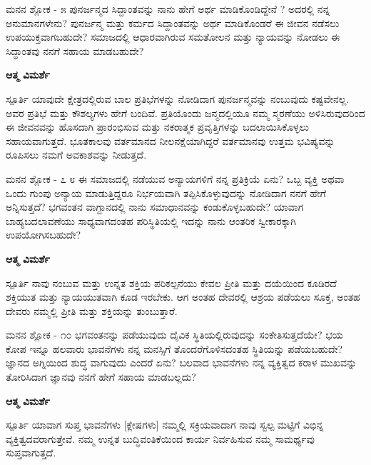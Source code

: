 \newpage
\begin{mananam}{\mananamfont ಮನನ ಶ್ಲೋಕ - ೫}
\footnotesize \mananamtext ಪುನರ್ಜನ್ಮದ ಸಿದ್ದಾಂತವನ್ನು ನಾನು ಹೇಗೆ ಅರ್ಥ ಮಾಡಿಕೊಂಡಿದ್ದೇನೆ ? ಅದರಲ್ಲಿ ನನ್ನ ಅನುಮಾನಗಳೇನು?  ಪುನರ್ಜನ್ಮ ಮತ್ತು ಕರ್ಮದ ಸಿದ್ದಾಂತವನ್ನು ಅರ್ಥ ಮಾಡಿಕೊಂಡರೆ ಈ ಜೀವನ ನಡೆಸಲು ಉಪಯುಕ್ತವಾಗಬಹುದೇ? ಸಮಾಜದಲ್ಲಿ ಆಧಾರವಾಗಿರುವ ಸಮತೋಲನ ಮತ್ತು ನ್ಯಾಯವನ್ನು ನೋಡಲು ಈ ಸಿದ್ಧಾಂತವು ನನಗೆ ಸಹಾಯ ಮಾಡಬಹುದೇ?
\end{mananam}
\WritingHand\enspace\textbf{ಆತ್ಮ ವಿಮರ್ಶೆ}\\
\begin{inspiration}{\mananamfont ಸ್ಪೂರ್ತಿ}
\footnotesize \mananamtext ಯಾವುದೇ ಕ್ಷೇತ್ರದಲ್ಲಿರುವ ಬಾಲ ಪ್ರತಿಭೆಗಳನ್ನು ನೋಡಿದಾಗ ಪುನರ್ಜನ್ಮವನ್ನು ನಂಬುವುದು ಕಷ್ಟವೇನಲ್ಲ. ಅವರ ಪ್ರತಿಭೆ ಮತ್ತು ಕೌಶಲ್ಯಗಳು ಹೇಗೆ ಬಂದಿವೆ. ಪ್ರತಿಯೊಂದು ಜನ್ಮದಲ್ಲಿಯೂ ನಮ್ಮ ಸ್ಮರಣೆಯು ಅಳಿಸಿರುವುದರಿಂದ ಈ ಜೀವನವನ್ನು ಹೊಸದಾಗಿ ಪ್ರಾರಂಭಿಸುವ ಮತ್ತು ನಕರಾತ್ಮಕ ಪ್ರವೃತ್ತಿಗಳನ್ನು ಬದಲಾಯಿಸಿಕೊಳ್ಳಲು ಸಹಾಯವಾಗುತ್ತದೆ. ಭೂತಕಾಲವು ವರ್ತಮಾನದ ನೀಲನಕ್ಷೆಯಾಗಿದ್ದರೆ ವರ್ತಮಾನವು ಉತ್ತಮ ಭವಿಷ್ಯವನ್ನು ರೂಪಿಸಲು ನಮಗೆ ಅವಕಾಶವನ್ನು ನೀಡುತ್ತದೆ.\\
\end{inspiration}
\newpage
\newpage
\begin{mananam}{\mananamfont ಮನನ ಶ್ಲೋಕ - ೭ ೮}
\footnotesize \mananamtext ಈ ಸಮಾಜದಲ್ಲಿ ನಡೆಯುವ ಅನ್ಯಾಯಗಳಿಗೆ ನನ್ನ ಪ್ರತಿಕ್ರಿಯೆ ಏನು? ಒಬ್ಬ ವ್ಯಕ್ತಿ ಅಥವಾ ಒಂದು ಗುಂಪು ಅನ್ಯಾಯ ಮಾಡುತ್ತಿದ್ದರೂ ನಿರ್ಭಯವಾಗಿ ತಪ್ಪಿಸಿಕೊಳ್ಳುವುದನ್ನು ನೋಡಿದಾಗ ನನಗೆ ಹೇಗೆ ಅನ್ನಿಸುತ್ತದೆ? ಭಗವಂತನ  ವಾಗ್ದಾನದಲ್ಲಿ ನಾನು ಸಮಾಧಾನವನ್ನು ಕಂಡುಕೊಳ್ಳಬಹುದೇ? ಯಾವಾಗ ಬಾಹ್ಯಬದಲಾವಣೆಯು ಸಾಧ್ಯವಾಗದಂತಹ ಪರಿಸ್ಥಿತಿಯಲ್ಲಿ ಇದನ್ನು ನಾನು ಆಂತರಿಕ ಸ್ವೀಕಾರಕ್ಕಾಗಿ ಉಪಯೋಗಿಸಬಹುದೇ?
\end{mananam}
\WritingHand\enspace\textbf{ಆತ್ಮ ವಿಮರ್ಶೆ}\\
\begin{inspiration}{\mananamfont ಸ್ಪೂರ್ತಿ}
\mananamtext ನಾವು ನಂಬುವ ಮತ್ತು ಉನ್ನತ ಶಕ್ತಿಯ ಪರಿಕಲ್ಪನೆಯು ಕೇವಲ ಪ್ರೀತಿ ಮತ್ತು ದಯೆಯಿಂದ ಕೂಡಿರದೆ ಶಕ್ತಿಯುತ ಮತ್ತು ನ್ಯಾಯಯುತವಾಗಿ ಕೂಡ ಇರಬೇಕು. ಆಗ ಅಂತಹ ದೇವರಲ್ಲಿ ಆಶ್ರಯ ಪಡೆಯಲು  ಸೂಕ್ತ, ಅಂತಹ ದೇವರು ನಮ್ಮಲ್ಲಿ ಪ್ರೀತಿ ಮತ್ತು ಶಕ್ತಿಯನ್ನು ತುಂಬುತ್ತಾರೆ.
\end{inspiration}
\newpage

\begin{mananam}{\mananamfont ಮನನ ಶ್ಲೋಕ - ೧೦}
\mananamtext ಭಗವಂತನನ್ನು ಪಡೆಯುವುದು ದೈವಿಕ ಸ್ಥಿತಿಯಲ್ಲಿರುವುದನ್ನು ಸಂಕೇತಿಸುತ್ತದೆಯೇ? ಭಯ ಕೋಪ ಇನ್ನೂ ಹಲವಾರು ಭಾವನೆಗಳು ನನ್ನ ಮನಸ್ಸಿಗೆ ತೊಂದರೆಗೊಳಿಸದಂತಹ ಸ್ಥಿತಿಯನ್ನು ಪಡೆಯಬಹುದೇ? ಜ್ಞಾನದ ಅಗ್ನಿಯಿಂದ ಶುದ್ಧ ವಾಗುವುದು ಎಂದರೆ ಏನು? ಬಲವಾದ ಭಾವನೆಗಳು ನನ್ನ ವ್ಯಕ್ತಿತ್ವದ ಕರಾಳ ಮುಖವನ್ನು ತೋರಿಸಿದಾಗ ಜ್ಞಾನವು ನನಗೆ ಹೇಗೆ ಸಹಾಯ ಮಾಡಬಲ್ಲದು?
\end{mananam}
\WritingHand\enspace\textbf{ಆತ್ಮ ವಿಮರ್ಶೆ}\\
\begin{inspiration}{\mananamfont ಸ್ಪೂರ್ತಿ}
\footnotesize \mananamtext ಯಾವಾಗ ಸುಪ್ತ ಭಾವನೆಗಳು [ಕ್ಲೇಷಗಳು] ನಮ್ಮಲ್ಲಿ ಸಕ್ರಿಯವಾದಾಗ ನಾವು ಸ್ವಲ್ಪ ಮಟ್ಟಿಗೆ ವಿಭಿನ್ನ ವ್ಯಕ್ತಿತ್ವದವರಾಗುತ್ತೇವೆ. ನಮ್ಮ ಉನ್ನತ ಬುದ್ಧಿವಂತಿಕೆಯಿಂದ ಕಾರ್ಯ ನಿರ್ವಹಿಸುವ ನಮ್ಮ  ಸಾಮರ್ಥ್ಯವು ಸುಪ್ತವಾಗುತ್ತದೆ.
\end{inspiration}
\newpage


